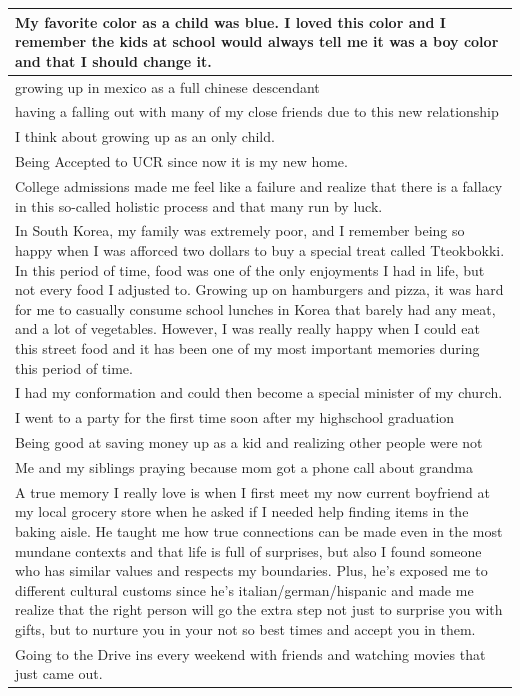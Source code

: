\documentclass[
  .7em,
  letterpaper,
  DIV=11,
  numbers=noendperiod]{scrartcl}
\begin{document}
\begin{table}
\begin{tabular}{l}
\hline
My favorite color as a child was blue. I loved this color and I remember the kids at school would always tell me it was a boy color and that I should change it.\\
\hline
growing up in mexico as a full chinese descendant\\
\hline
having a falling out with many of my close friends due to this new relationship\\
\hline
I think about growing up as an only child.\\
\hline
Being Accepted to UCR since now it is my new home.\\
\hline
College admissions made me feel like a failure and realize that there is a fallacy in this so-called holistic process and that many run by luck.\\
\hline
In South Korea, my family was extremely poor, and I remember being so happy when I was afforced two dollars to buy a special treat called Tteokbokki. In this period of time, food was one of the only enjoyments I had in life, but not every food I adjusted to. Growing up on hamburgers and pizza, it was hard for me to casually consume school lunches in Korea that barely had any meat, and a lot of vegetables. However, I was really really happy when I could eat this street food and it has been one of my most important memories during this period of time.\\
\hline
I had my conformation and could then become a special minister of my church.\\
\hline
I went to a party for the first time soon after my highschool graduation\\
\hline
Being good at saving money up as a kid and realizing other people were not\\
\hline
Me and my siblings praying because mom got a phone call about grandma\\
\hline
A true memory I really love is when I first meet my now current boyfriend at my local grocery store when he asked if I needed help finding items in the baking aisle. He taught me how true connections can be made even in the most mundane contexts and that life is full of surprises, but also I found someone who has similar values and respects my boundaries. Plus, he's exposed me to different cultural customs since he's italian/german/hispanic and made me realize that the right person will go the extra step not just to surprise you with gifts, but to nurture you in your not so best times and accept you in them.\\
\hline
Going to the Drive ins every weekend with friends and watching movies that just came out.\\

\end{tabular}
\end{table}
\end{document}
